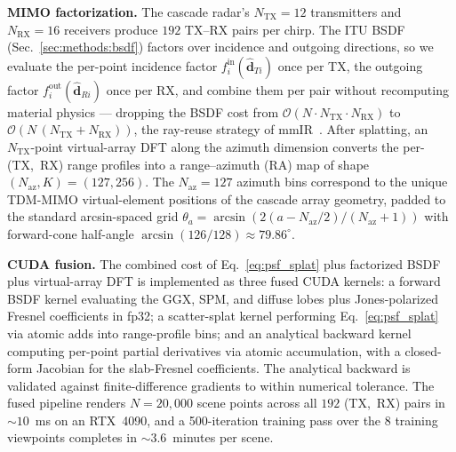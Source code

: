 \textbf{MIMO factorization.} The cascade radar's $N_{\text{TX}}{=}12$ transmitters and $N_{\text{RX}}{=}16$ receivers produce $192$ TX--RX pairs per chirp. The ITU BSDF (Sec.~\ref{sec:methods:bsdf}) factors over incidence and outgoing directions, so we evaluate the per-point incidence factor $f_i^{\text{in}}(\hat{\mathbf{d}}_{Ti})$ once per TX, the outgoing factor $f_i^{\text{out}}(\hat{\mathbf{d}}_{Ri})$ once per RX, and combine them per pair without recomputing material physics --- dropping the BSDF cost from $\mathcal{O}(N\!\cdot\!N_{\text{TX}}\!\cdot\!N_{\text{RX}})$ to $\mathcal{O}(N\,(N_{\text{TX}}{+}N_{\text{RX}}))$, the ray-reuse strategy of mmIR~\cite{mmIR2026,9533181}. After splatting, an $N_{\text{TX}}$-point virtual-array DFT along the azimuth dimension converts the per-(TX,~RX) range profiles into a range--azimuth (RA) map of shape $(N_{\text{az}},K) = (127, 256)$. The $N_{\text{az}}{=}127$ azimuth bins correspond to the unique TDM-MIMO virtual-element positions of the cascade array geometry, padded to the standard arcsin-spaced grid $\theta_a = \arcsin(2(a{-}N_{\text{az}}/2)/(N_{\text{az}}{+}1))$ with forward-cone half-angle $\arcsin(126/128) \approx 79.86^\circ$.

\textbf{CUDA fusion.} The combined cost of Eq.~\eqref{eq:psf_splat} plus factorized BSDF plus virtual-array DFT is implemented as three fused CUDA kernels: a forward BSDF kernel evaluating the GGX, SPM, and diffuse lobes plus Jones-polarized Fresnel coefficients in fp32; a scatter-splat kernel performing Eq.~\eqref{eq:psf_splat} via atomic adds into range-profile bins; and an analytical backward kernel computing per-point partial derivatives via atomic accumulation, with a closed-form Jacobian for the slab-Fresnel coefficients. The analytical backward is validated against finite-difference gradients to within numerical tolerance. The fused pipeline renders $N{=}20{,}000$ scene points across all $192$ (TX,~RX) pairs in ${\sim}10$~ms on an RTX~4090, and a 500-iteration training pass over the 8 training viewpoints completes in ${\sim}3.6$~minutes per scene.

